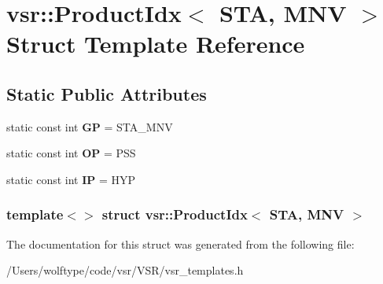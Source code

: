 \hypertarget{structvsr_1_1_product_idx_3_01_s_t_a_00_01_m_n_v_01_4}{\section{vsr\-:\-:Product\-Idx$<$ S\-T\-A, M\-N\-V $>$ Struct Template Reference}
\label{structvsr_1_1_product_idx_3_01_s_t_a_00_01_m_n_v_01_4}
}
\subsection*{Static Public Attributes}
\begin{DoxyCompactItemize}
\item 
\hypertarget{structvsr_1_1_product_idx_3_01_s_t_a_00_01_m_n_v_01_4_a96ff480da991453e87f15bbdb13777c9}{static const int {\bfseries G\-P} = S\-T\-A\-\_\-\-M\-N\-V}\label{structvsr_1_1_product_idx_3_01_s_t_a_00_01_m_n_v_01_4_a96ff480da991453e87f15bbdb13777c9}

\item 
\hypertarget{structvsr_1_1_product_idx_3_01_s_t_a_00_01_m_n_v_01_4_a124c99da3f26fe47efbce3b1cfea7b1c}{static const int {\bfseries O\-P} = P\-S\-S}\label{structvsr_1_1_product_idx_3_01_s_t_a_00_01_m_n_v_01_4_a124c99da3f26fe47efbce3b1cfea7b1c}

\item 
\hypertarget{structvsr_1_1_product_idx_3_01_s_t_a_00_01_m_n_v_01_4_ab72c1296bb3398b0e159112230d445fd}{static const int {\bfseries I\-P} = H\-Y\-P}\label{structvsr_1_1_product_idx_3_01_s_t_a_00_01_m_n_v_01_4_ab72c1296bb3398b0e159112230d445fd}

\end{DoxyCompactItemize}
\subsubsection*{template$<$$>$ struct vsr\-::\-Product\-Idx$<$ S\-T\-A, M\-N\-V $>$}



The documentation for this struct was generated from the following file\-:\begin{DoxyCompactItemize}
\item 
/\-Users/wolftype/code/vsr/\-V\-S\-R/vsr\-\_\-templates.\-h\end{DoxyCompactItemize}
